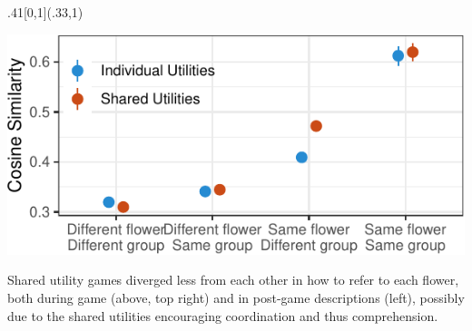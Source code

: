 \documentclass[10pt, xcolor=table, dvipsnames]{beamer}
\begin{document}
	\begin{textblock}{.41}[0,1](.33,1)
	\begin{tcolorbox}[title={ \centering 					Shared utilities games diverged less}]  
		\begin{minipage}{.4\textwidth}
			\vspace{.5em}
			\includegraphics[width=\textwidth]{withinend-1.pdf}    
		\end{minipage}
	\hfill
	\noindent
	\begin{minipage}{.55\textwidth}
				\begin{small}
					\vspace{.5em}
			Shared utility games diverged less from each other in how to refer to each flower, both during game (above, top right) and in post-game descriptions (left), possibly due to the shared utilities encouraging coordination and thus comprehension.
				
				\vspace{.2em}
				\end{small}
			
	\end{minipage}

		
		                        			                                                  
	\end{tcolorbox}
\end{textblock}
\end{document}
